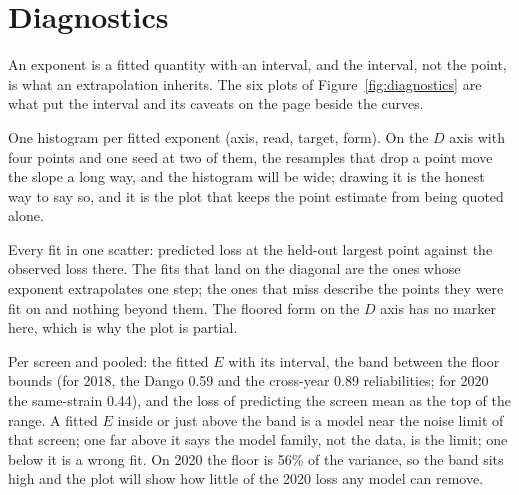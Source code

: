 
\section{Diagnostics}
\label{sec:diagnostics}

An exponent is a fitted quantity with an interval, and the interval, not the
point, is what an extrapolation inherits. The six plots of
Figure~\ref{fig:diagnostics} are what put the interval and its caveats on the
page beside the curves.


One histogram per fitted exponent (axis, read, target, form). On the $D$ axis
with four points and one seed at two of them, the resamples that drop a point
move the slope a long way, and the histogram will be wide; drawing it is the
honest way to say so, and it is the plot that keeps the point estimate from
being quoted alone.

Every fit in one scatter: predicted loss at the held-out largest point against
the observed loss there. The fits that land on the diagonal are the ones whose
exponent extrapolates one step; the ones that miss describe the points they
were fit on and nothing beyond them. The floored form on the $D$ axis has no
marker here, which is why the plot is partial.

Per screen and pooled: the fitted $E$ with its interval, the band between the
floor bounds (for 2018, the Dango 0.59 and the cross-year 0.89 reliabilities;
for 2020 the same-strain 0.44), and the loss of predicting the screen mean as the
top of the range. A fitted $E$ inside or just above the band is a model near the
noise limit of that screen; one far above it says the model family, not the
data, is the limit; one below it is a wrong fit. On 2020 the floor is 56\% of
the variance, so the band sits high and the plot will show how little of the
2020 loss any model can remove.

